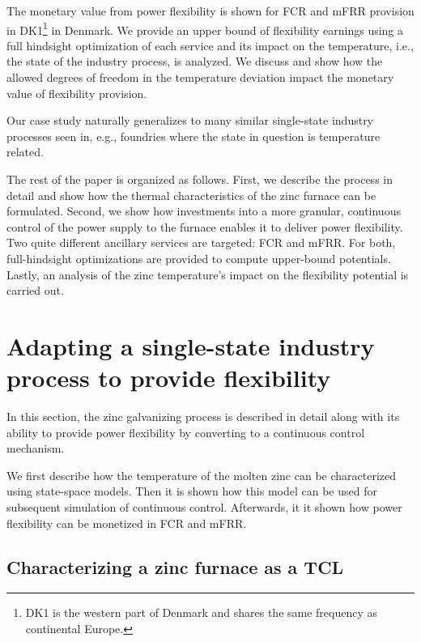 \documentclass[lettersize,journal]{IEEEtran}
\begin{document}
The monetary value from power flexibility is shown for FCR and mFRR provision in DK1\footnote{DK1 is the western part of Denmark and shares the same frequency as continental Europe.} in Denmark. We provide an upper bound of flexibility earnings using a full hindsight optimization of each service and its impact on the temperature, i.e., the state of the industry process, is analyzed. We discuss and show how the allowed degrees of freedom in the temperature deviation impact the monetary value of flexibility provision.

Our case study naturally generalizes to many similar single-state industry processes seen in, e.g., foundries where the state in question is temperature related.


The rest of the paper is organized as follows. First, we describe the process in detail and show how the thermal characteristics of the zinc furnace can be formulated. Second, we show how investments into a more granular, continuous control of the power supply to the furnace enables it to deliver power flexibility. Two quite different ancillary services are targeted: FCR and mFRR. For both, full-hindsight optimizations are provided to compute upper-bound potentials. Lastly, an analysis of the zinc temperature's impact on the flexibility potential is carried out.

\section{Adapting a single-state industry process to provide flexibility}\label{sec:zinc_furnace_description}

In this section, the zinc galvanizing process is described in detail along with its ability to provide power flexibility by converting to a continuous control mechanism.

We first describe how the temperature of the molten zinc can be characterized using state-space models. Then it is shown how this model can be used for subsequent simulation of continuous control. Afterwards, it it shown how power flexibility can be monetized in FCR and mFRR.

\subsection{Characterizing a zinc furnace as a TCL}
\end{document}
